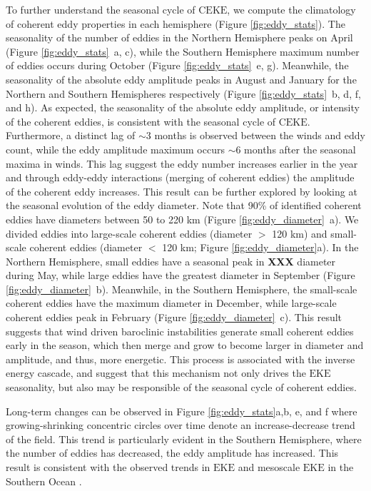 \documentclass[draft,linenumbers]{agujournal2019}
\newcommand{\EKE}{\textrm{EKE}}
\newcommand{\CEKE}{\textrm{CEKE}}
\begin{document}
	To further understand the seasonal cycle of $\CEKE$, we compute the climatology of coherent eddy properties in each hemisphere (Figure \ref{fig:eddy_stats}). 
	The seasonality of the number of eddies in the Northern Hemisphere peaks on April (Figure \ref{fig:eddy_stats}~a, c), while the Southern Hemisphere maximum number of eddies occurs during October (Figure \ref{fig:eddy_stats}~e, g). 
	Meanwhile, the seasonality of the absolute eddy amplitude peaks in August and January for the Northern and Southern Hemispheres respectively (Figure \ref{fig:eddy_stats}~b, d, f, and h). 
	As expected, the seasonality of the absolute eddy amplitude, or intensity of the coherent eddies, is consistent with the seasonal cycle of $\CEKE$. 
	Furthermore, a distinct lag of $\sim$3 months is observed between the winds and eddy count, while the eddy amplitude maximum occurs $\sim$6 months after the seasonal maxima in winds. 
	This lag suggest the eddy number increases earlier in the year and through eddy-eddy interactions (merging of coherent eddies) the amplitude of the coherent eddy increases. 
	This result can be further explored by looking at the seasonal evolution of the eddy diameter. Note that 90\% of identified coherent eddies have diameters between 50 to 220 km (Figure \ref{fig:eddy_diameter}~a). We divided eddies into large-scale coherent eddies (diameter $>$ 120 km) and  small-scale coherent eddies (diameter $<$ 120 km; Figure \ref{fig:eddy_diameter}a). In the Northern Hemisphere, small eddies have a seasonal peak in \textbf{XXX} diameter during May, while large eddies have the greatest diameter in September (Figure \ref{fig:eddy_diameter}~b).
	Meanwhile, in the Southern Hemisphere, the small-scale coherent eddies have the maximum diameter in December, while large-scale coherent eddies peak in 
	February (Figure \ref{fig:eddy_diameter}~c). This result suggests that wind driven baroclinic instabilities generate small coherent eddies early in the season, which then merge and grow to become larger in diameter and amplitude, and thus, more energetic. This process is associated with the inverse energy cascade, and suggest that this mechanism not only drives the $\EKE$ seasonality, but also may be responsible of the seasonal cycle of coherent eddies. 

	Long-term changes can be observed in Figure \ref{fig:eddy_stats}a,b, e, and f where growing-shrinking concentric circles over time denote an increase-decrease trend of the field. 
	This trend is particularly evident in the Southern Hemisphere, where the number of eddies has decreased, the eddy amplitude has increased. 
	This result is consistent with the observed trends in $\EKE$ and mesoscale $\EKE$ in the Southern Ocean \citep{Hogg_Recent_2015,Martinez_TKE_2019}. 
\end{document}
